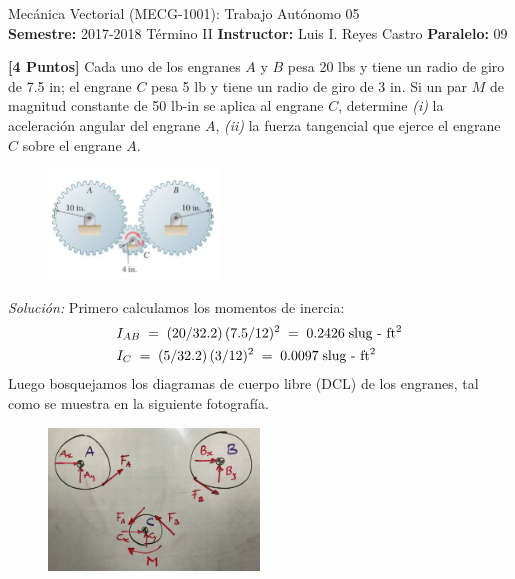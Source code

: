 \documentclass[ a4paper, twoside, 11pt]{article}
\newcommand{\numero}{05}
\begin{document}
\allowdisplaybreaks

\begin{center}
\Large Mec\'anica Vectorial (MECG-1001): Trabajo Aut\'onomo \numero \\[2ex]
\small \textbf{Semestre:} 2017-2018 T\'ermino II \qquad
\textbf{Instructor:} Luis I. Reyes Castro \qquad
\textbf{Paralelo:} 09
\end{center}
\fullskip

\begin{problem}
\textbf{[4 Puntos]} Cada uno de los engranes $A$ y $B$ pesa 20 lbs y tiene un radio de giro de 7.5 in; el engrane $C$ pesa 5 lb y tiene un radio de giro de 3 in. Si un par $M$ de magnitud constante de 50 lb-in se aplica al engrane $C$, determine \textit{(i)} la aceleraci\'on angular del engrane $A$, \linebreak \textit{(ii)} la fuerza tangencial que ejerce el engrane $C$ sobre el engrane $A$.

\begin{figure}[htb]
\centering
\includegraphics[width=0.4\textwidth]{problema-1.jpg}
\end{figure}

\emph{Soluci\'on:} Primero calculamos los momentos de inercia: 
\begin{align*}
& I_{AB} \; = \; (20/32.2) \, (7.5/12)^2 \; = \;
0.2426 \; \text{slug - ft\ensuremath{^{\text{2}}}} \\
& I_{C} \; = \; (5/32.2) \, (3/12)^2 \; = \;
0.0097 \; \text{slug - ft\ensuremath{^{\text{2}}}}
\end{align*}
Luego bosquejamos los diagramas de cuerpo libre (DCL) de los engranes, tal como se muestra en la siguiente fotograf\'ia. 
\begin{figure}[htb]
\centering
\includegraphics[width=0.5\textwidth]{problema-1_DCL.jpg}
\end{figure}


\end{problem}
\end{document}
